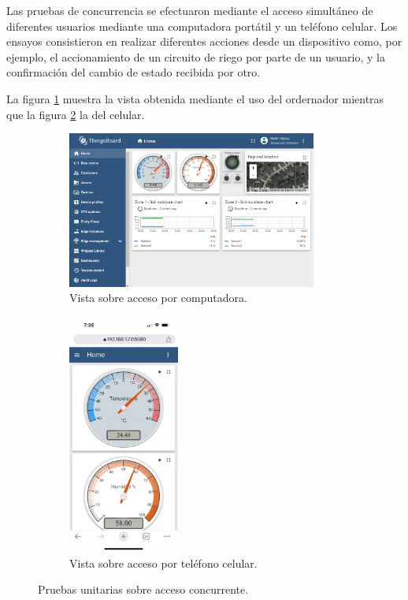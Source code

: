 Las pruebas de concurrencia se efectuaron mediante el acceso simultáneo de diferentes usuarios mediante una computadora portátil y un teléfono celular. Los ensayos consistieron en realizar diferentes acciones desde un dispositivo como, por ejemplo, el accionamiento de un circuito de riego por parte de un usuario, y la confirmación del cambio de estado recibida por otro. 
 
La figura \ref{fig:tb_compu} muestra la vista obtenida mediante el uso del ordernador mientras que la figura  \ref{fig:tb_celu} la del celular.

\begin{figure}[htpb]
     \centering
       \begin{subfigure}[b]{0.53\textwidth}
	    \centering
		 \includegraphics[width=0.9\textwidth]{./Figures/chapter4/tb_compu.jpg}
		\caption{Vista sobre acceso por computadora.}
		\label{fig:tb_compu}
     \end{subfigure}
          \hfill
     \begin{subfigure}[b]{0.45\textwidth}
		\centering
		\includegraphics[width=0.40\textwidth]{./Figures/chapter4/tb_celu.jpg}
		\caption{Vista sobre acceso por teléfono celular.}
		\label{fig:tb_celu}
     \end{subfigure}
     \hfill
        \caption[Pruebas unitarias sobre acceso concurrente]{Pruebas unitarias sobre acceso concurrente.}
        \label{fig:tb_concurrencia}
\end{figure}

